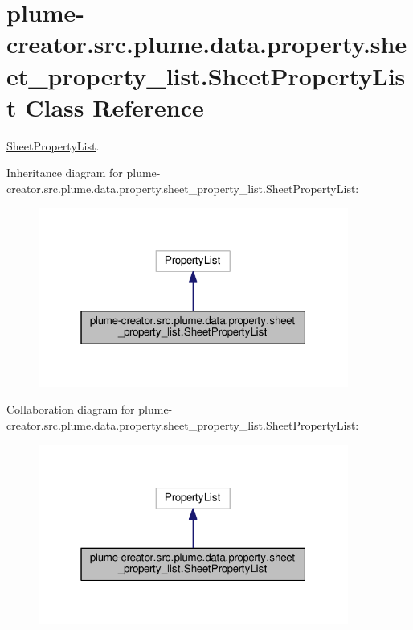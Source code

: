 \hypertarget{classplume-creator_1_1src_1_1plume_1_1data_1_1property_1_1sheet__property__list_1_1_sheet_property_list}{}\section{plume-\/creator.src.\+plume.\+data.\+property.\+sheet\+\_\+property\+\_\+list.\+Sheet\+Property\+List Class Reference}
\label{classplume-creator_1_1src_1_1plume_1_1data_1_1property_1_1sheet__property__list_1_1_sheet_property_list}


\hyperlink{classplume-creator_1_1src_1_1plume_1_1data_1_1property_1_1sheet__property__list_1_1_sheet_property_list}{Sheet\+Property\+List}.  




Inheritance diagram for plume-\/creator.src.\+plume.\+data.\+property.\+sheet\+\_\+property\+\_\+list.\+Sheet\+Property\+List\+:\nopagebreak
\begin{figure}[H]
\begin{center}
\leavevmode
\includegraphics[width=289pt]{classplume-creator_1_1src_1_1plume_1_1data_1_1property_1_1sheet__property__list_1_1_sheet_property_list__inherit__graph}
\end{center}
\end{figure}


Collaboration diagram for plume-\/creator.src.\+plume.\+data.\+property.\+sheet\+\_\+property\+\_\+list.\+Sheet\+Property\+List\+:\nopagebreak
\begin{figure}[H]
\begin{center}
\leavevmode
\includegraphics[width=289pt]{classplume-creator_1_1src_1_1plume_1_1data_1_1property_1_1sheet__property__list_1_1_sheet_property_list__coll__graph}
\end{center}
\end{figure}
